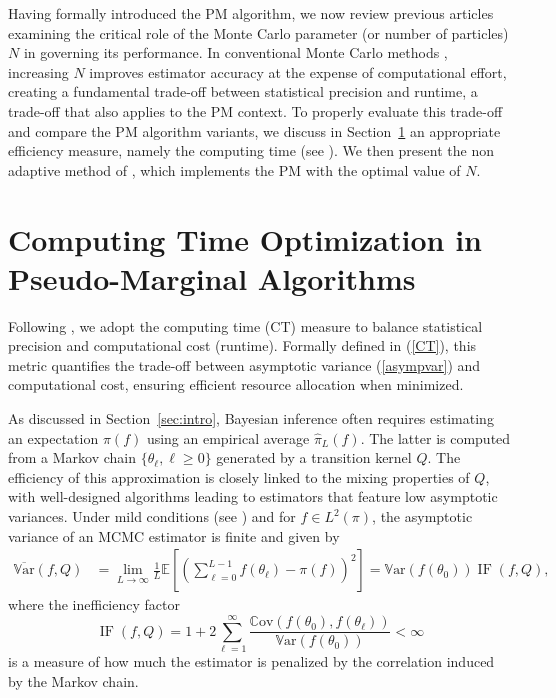 \documentclass[pdflatex,sn-mathphys-num]{sn-jnl}
\newcommand{\E}{\mathbb{E}}
\newcommand{\Var}{\mathbb{V}\text{ar}}
\newcommand{\Cov}{\mathbb{C}\text{ov}}
\renewcommand{\geq}{\geqslant}
\theoremstyle{thmstyleone}
\theoremstyle{thmstyletwo}
\theoremstyle{thmstylethree}
\begin{document}
Having formally introduced the PM algorithm, we now review previous articles examining the critical role of the Monte Carlo parameter (or number of particles) \( N \) in governing its performance. In conventional Monte Carlo methods \cite{robert_monte_2004}, increasing \( N \) improves estimator accuracy at the expense of computational effort, creating a fundamental trade-off between statistical precision and runtime, a trade-off that also applies to the PM context. To properly evaluate this trade-off and compare the PM algorithm variants, we discuss in Section~\ref{sec:review} an appropriate efficiency measure, namely the computing time (see \cite{pitt_properties_2012,doucet_efficient_2015,schmon_large-sample_2021}). We then present the non adaptive method of \cite{schmon_large-sample_2021}, which implements the PM with the optimal value of \(N\).

\section{Computing Time Optimization in Pseudo-Marginal Algorithms}
\label{sec:review}
Following \cite{pitt_properties_2012, doucet_efficient_2015, schmon_large-sample_2021}, we adopt the computing time (CT) measure to balance statistical precision and computational cost (runtime).  Formally defined in (\ref{CT}), this metric quantifies the trade-off between asymptotic variance (\ref{asympvar}) and computational cost, ensuring efficient resource allocation when minimized.

As discussed in Section~\ref{sec:intro}, Bayesian inference often requires estimating an expectation $\pi(f)$ using an empirical average $\widehat{\pi}_L(f)$. The latter is computed from a Markov chain $\{\theta_\ell, \ell \geq 0\}$ generated by a transition kernel $Q$. The efficiency of this approximation is closely linked to the mixing properties of $Q$, with well-designed algorithms leading to estimators that feature low asymptotic variances. Under mild conditions (see \cite{haggstrom_variance_2007}) and for $f \in L^2(\pi)$, the asymptotic variance of an MCMC estimator is finite and given by
\begin{align}
    \overline{\Var}(f, Q) &= \lim_{L \rightarrow \infty} \frac{1}{L} \E \left[\left(\sum_{\ell=0}^{L-1} f(\theta_\ell) - \pi(f)\right)^2 \right] 
    = \Var(f(\theta_0)) \operatorname{IF}(f, Q),
    \label{asympvar}
\end{align}
where the inefficiency factor 
\begin{equation}
    \operatorname{IF}(f, Q) = 1 + 2\sum_{\ell=1}^{\infty}\frac{\Cov(f(\theta_0),f(\theta_\ell))}{\Var(f(\theta_0))} < \infty
    \label{inefficiency}
\end{equation}
is a measure of how much the estimator is penalized by the correlation induced by the Markov chain.
\end{document}
